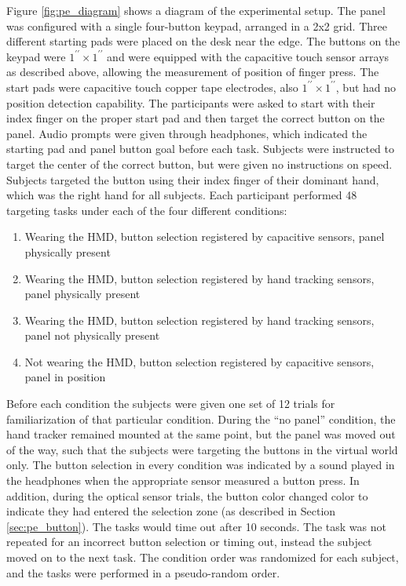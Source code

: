Figure \ref{fig:pe_diagram} shows a diagram of the experimental setup.
The panel was configured with a single four-button keypad, arranged in a 2x2 grid.
Three different starting pads were placed on the desk near the edge.
The buttons on the keypad were $1^{\prime\prime} \times 1^{\prime\prime}$ and were equipped with the capacitive touch sensor arrays as described above, allowing the measurement of position of finger press.
The start pads were capacitive touch copper tape electrodes, also $1^{\prime\prime} \times 1^{\prime\prime}$, but had no position detection capability.
The participants were asked to start with their index finger on the proper start pad and then target the correct button on the panel.
Audio prompts were given through headphones, which indicated the starting pad and panel button goal before each task.
Subjects were instructed to target the center of the correct button, but were given no instructions on speed.
Subjects targeted the button using their index finger of their dominant hand, which was the right hand for all subjects.
Each participant performed 48 targeting tasks under each of the four different conditions:
\begin{enumerate}
    \item  Wearing the HMD, button selection registered by capacitive sensors, panel physically present
    \item Wearing the HMD, button selection registered by hand tracking sensors, panel physically present
    \item Wearing the HMD, button selection registered by hand tracking sensors, panel not physically present
    \item Not wearing the HMD, button selection registered by capacitive sensors, panel in position
\end{enumerate}
Before each condition the subjects were given one set of 12 trials for familiarization of that particular condition.
During the ``no panel'' condition, the hand tracker remained mounted at the same point, but the panel was moved out of the way, such that the subjects were targeting the buttons in the virtual world only.
The button selection in every condition was indicated by a sound played in the headphones when the appropriate sensor measured a button press.
In addition, during the optical sensor trials, the button color changed color to indicate they had entered the selection zone (as described in Section \ref{sec:pe_button}).
The tasks would time out after 10 seconds.
The task was not repeated for an incorrect button selection or timing out, instead the subject moved on to the next task.
The condition order was randomized for each subject, and the tasks were performed in a pseudo-random order.

